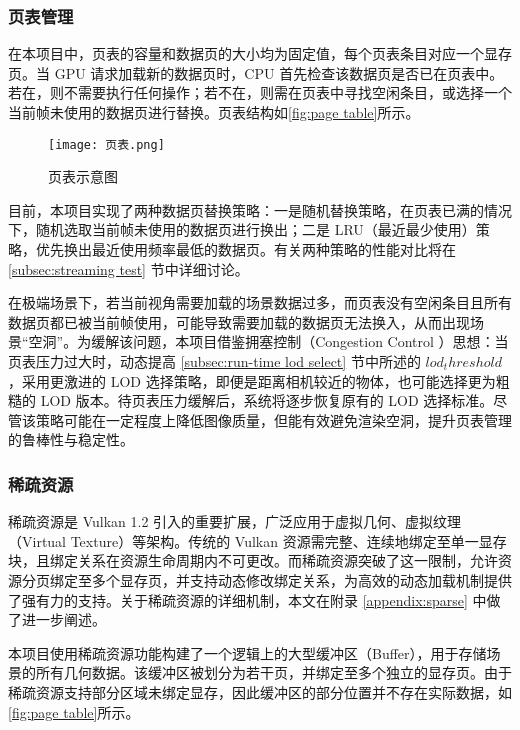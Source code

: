 \subsubsection{页表管理}

在本项目中，页表的容量和数据页的大小均为固定值，每个页表条目对应一个显存页。当 GPU 请求加载新的数据页时，CPU 首先检查该数据页是否已在页表中。若在，则不需要执行任何操作；若不在，则需在页表中寻找空闲条目，或选择一个当前帧未使用的数据页进行替换。页表结构如\autoref{fig:page table}所示。

\begin{figure}[htbp]
\centering
\texttt{[image: 页表.png]}
\caption{\label{fig:page table}页表示意图}
\end{figure}

目前，本项目实现了两种数据页替换策略：一是随机替换策略，在页表已满的情况下，随机选取当前帧未使用的数据页进行换出；二是 LRU（最近最少使用）策略，优先换出最近使用频率最低的数据页。有关两种策略的性能对比将在 \ref{subsec:streaming test} 节中详细讨论。

在极端场景下，若当前视角需要加载的场景数据过多，而页表没有空闲条目且所有数据页都已被当前帧使用，可能导致需要加载的数据页无法换入，从而出现场景“空洞”。为缓解该问题，本项目借鉴拥塞控制（Congestion Control
）思想\cite{Wiki-congestion}：当页表压力过大时，动态提高 \ref{subsec:run-time lod select} 节中所述的 $lod_threshold$，采用更激进的 LOD 选择策略，即便是距离相机较近的物体，也可能选择更为粗糙的 LOD 版本。待页表压力缓解后，系统将逐步恢复原有的 LOD 选择标准。尽管该策略可能在一定程度上降低图像质量，但能有效避免渲染空洞，提升页表管理的鲁棒性与稳定性。

\subsubsection{稀疏资源}

稀疏资源是 Vulkan 1.2 引入的重要扩展，广泛应用于虚拟几何、虚拟纹理（Virtual Texture）等架构\cite{SparseResources}。传统的 Vulkan 资源需完整、连续地绑定至单一显存块，且绑定关系在资源生命周期内不可更改。而稀疏资源突破了这一限制，允许资源分页绑定至多个显存页，并支持动态修改绑定关系，为高效的动态加载机制提供了强有力的支持。关于稀疏资源的详细机制，本文在附录 \ref{appendix:sparse} 中做了进一步阐述。

本项目使用稀疏资源功能构建了一个逻辑上的大型缓冲区（Buffer），用于存储场景的所有几何数据。该缓冲区被划分为若干页，并绑定至多个独立的显存页。由于稀疏资源支持部分区域未绑定显存，因此缓冲区的部分位置并不存在实际数据，如\autoref{fig:page table}所示。

